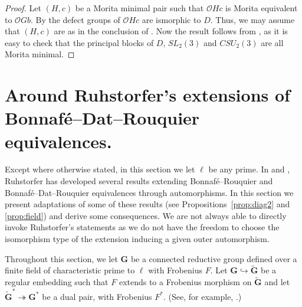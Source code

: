 \documentclass{amsart}
\theoremstyle{plain}\newtheorem{Theorem}{Theorem}[section]
\theoremstyle{plain}\newtheorem{Conjecture}[Theorem]{Conjecture}
\theoremstyle{plain}\newtheorem{Corollary}[Theorem]{Corollary}
\theoremstyle{plain}\newtheorem{Lemma}[Theorem]{Lemma}
\theoremstyle{plain}\newtheorem{Proposition}[Theorem]{Proposition}
\theoremstyle{definition}\newtheorem{Definition}[Theorem]{Definition}
\theoremstyle{definition}\newtheorem{Example}[Theorem]{Example}
\theoremstyle{definition}\newtheorem{Examples}[Theorem]{Examples}
\theoremstyle{definition}\newtheorem{Exercise}[Theorem]{Exercise}
\theoremstyle{definition}\newtheorem{Notation}[Theorem]{Notation}
\theoremstyle{definition}\newtheorem{Remark}[Theorem]{Remark}
\theoremstyle{definition}\newtheorem{Remarks}[Theorem]{Remarks}
\def\CO{{\mathcal{O}}}    \def\OPE{{\mathcal{O}(P\rtimes E)}}
\newcommand{\bG}{{\mathbf{G}}}
\numberwithin{equation}{section}
\begin{document}
\begin{proof}  Let $(H,c)$ be a Morita minimal pair such that  $\CO Hc$ is Morita equivalent to $\CO Gb $.  By   the defect  groups of $\CO Hc$  are ismorphic to $D$.  Thus, we may assume that  $(H,c)$  are as in the conclusion  of  . Now the result follows from  , as it is easy to check that the principal blocks of $D$, $SL_2(3)$ and $CSU_2(3)$ are all Morita minimal.
\end{proof}



\section{Around Ruhstorfer's extensions of  Bonnaf\'e--Dat--Rouquier equivalences.}\label{sec:extendBDR}
Except where otherwise stated, in this section we let $\ell$ be any prime.
  In  \cite{Ruh22}  and \cite{Ru22},  Ruhstorfer has developed several results   extending  Bonnaf\'e--Rouquier and Bonnaf\'e--Dat--Rouquier  equivalences   through  automorphisms.   In this section we  present adaptations  of some  of these results (see Propositions~\ref{prop:diag2} and \ref{prop:field}) and derive some consequences. We are  not always  able to  directly  invoke  Ruhstorfer's statements  as we  do not have  the freedom  to  choose the isomorphism type of  the extension  inducing a given outer automorphism. 

 
 
 Throughout this  section, we let  $\bG$ be   a  connected reductive group defined over a finite field of characteristic  prime to $\ell$  with  Frobenius $F$. Let $\bG \hookrightarrow \tilde \bG$  be a regular embedding such that $F$   extends to a Frobenius morphism on $\tilde \bG$   and let   $\tilde \bG^*  \twoheadrightarrow \bG^*  $ be  a dual   pair,  with Frobenius $F^*$. (See, for example, \cite[Ch.~15]{CaEnbook}.)
\end{document}
